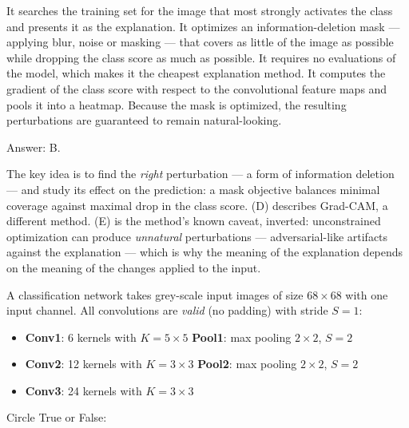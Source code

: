 \documentclass[11pt]{exam}
\newcommand{\TFF}{True\hspace{1.1em}\ifprintanswers\textbf{FALSE}\else False\fi}
\begin{document}
\begin{questions}
\begin{choices}
  \choice It searches the training set for the image that most strongly activates the class and
  presents it as the explanation.
  \choice It optimizes an information-deletion mask --- applying blur, noise or masking --- that
  covers as little of the image as possible while dropping the class score as much as possible.
  \choice It requires no evaluations of the model, which makes it the cheapest explanation method.
  \choice It computes the gradient of the class score with respect to the convolutional feature
  maps and pools it into a heatmap.
  \choice Because the mask is optimized, the resulting perturbations are guaranteed to remain
  natural-looking.
\end{choices}

\begin{solution}
  Answer: B.

  The key idea is to find the \emph{right} perturbation --- a form of information deletion --- and
  study its effect on the prediction: a mask objective balances minimal coverage against maximal
  drop in the class score. (D) describes Grad-CAM, a different method. (E) is the method's known
  caveat, inverted: unconstrained optimization can produce \emph{unnatural} perturbations ---
  adversarial-like artifacts against the explanation --- which is why the meaning of the
  explanation depends on the meaning of the changes applied to the input.
\end{solution}

\question
A classification network takes grey-scale input images of size $68 \times 68$ with one input
channel. All convolutions are \emph{valid} (no padding) with stride $S = 1$:

\begin{itemize}
  \item \textbf{Conv1}: 6 kernels with $K = 5 \times 5$ \quad\textbf{Pool1}: max pooling
    $2 \times 2$, $S = 2$
  \item \textbf{Conv2}: 12 kernels with $K = 3 \times 3$ \quad\textbf{Pool2}: max pooling
    $2 \times 2$, $S = 2$
  \item \textbf{Conv3}: 24 kernels with $K = 3 \times 3$
\end{itemize}

\noindent Circle True or False:

\end{questions}
\end{document}
